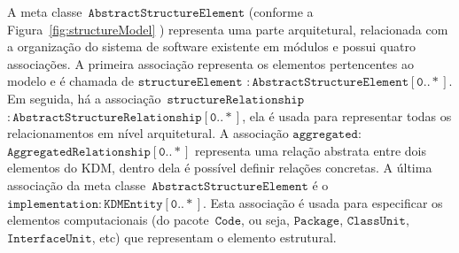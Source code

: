 A meta classe~$\mathtt{AbstractStructureElement}$ (conforme a Figura~\ref{fig:structureModel} ) representa uma parte arquitetural, relacionada com a organização do sistema de software existente em módulos e possui quatro associações. A primeira associação representa os elementos pertencentes ao modelo e é chamada de $\mathtt{structureElement}$ $\mathtt{:AbstractStructureElement[0..*]}$. Em seguida, há a associação~$\mathtt{structureRelationship}$ $\mathtt{:AbstractStructureRelationship[0..*]}$, ela é usada para representar todas os relacionamentos em nível arquitetural. A associação $\mathtt{aggregated:}$ $\mathtt{AggregatedRelationship[0..*]}$ representa uma relação abstrata entre dois elementos do KDM, dentro dela é possível definir relações concretas. A última associação da meta classe~$\mathtt{AbstractStructureElement}$ é o~$\mathtt{implementation:KDMEntity[0..*]}$. Esta associação é usada para especificar os elementos computacionais (do pacote~$\mathtt{Code}$, ou seja, $\mathtt{Package}$, $\mathtt{ClassUnit}$, $\mathtt{InterfaceUnit}$, etc) que representam o elemento estrutural. 


